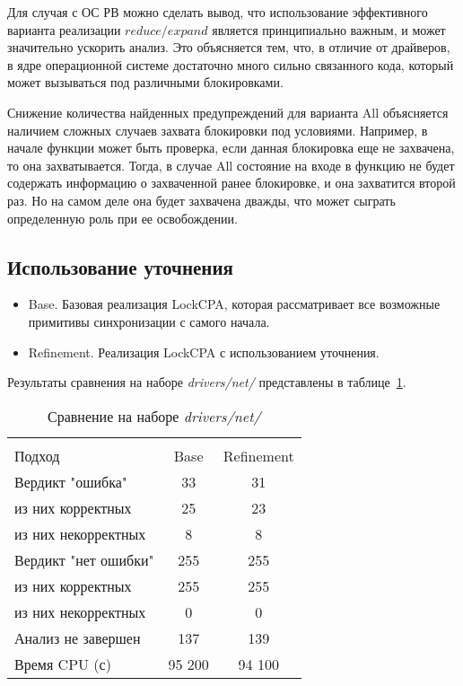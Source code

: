 Для случая с ОС РВ можно сделать вывод, что использование эффективного варианта реализации $reduce/expand$ является принципиально важным, и может значительно ускорить анализ.
Это объясняется тем, что, в отличие от драйверов, в ядре операционной системе достаточно много сильно связанного кода, который может вызываться под различными блокировками.

Снижение количества найденных предупреждений для варианта All объясняется наличием сложных случаев захвата блокировки под условиями.
Например, в начале функции может быть проверка, если данная блокировка еще не захвачена, то она захватывается. 
Тогда, в случае All состояние на входе в функцию не будет содержать информацию о захваченной ранее блокировке, и она захватится второй раз.
Но на самом деле она будет захвачена дважды, что может сыграть определенную роль при ее освобождении. 

\subsection{Использование уточнения}

\begin{itemize}
\item Base. Базовая реализация LockCPA, которая рассматривает все возможные примитивы синхронизации с самого начала.
\item Refinement. Реализация LockCPA с использованием уточнения.
\end{itemize}

Результаты сравнения на наборе \textit{drivers/net/} представлены в таблице~\ref{table-drivers-lock-refinement}.

  \begin{table}[h]\footnotesize \centering
    \caption{Сравнение на наборе \textit{drivers/net/}}
  	\label{table-drivers-lock-refinement}
    \begin{tabular}{ | l | c | c | }
      \hline 
      		& 		\multicolumn{2}{c|}{\combatmode}  \\
      Подход         				& Base   	& Refinement \\ \hline
      Вердикт "ошибка" 				& 33    	& 31       \\ 
  \hspace{0.5cm} из них корректных 	& 25 		& 23 		\\ 
  \hspace{0.5cm} из них некорректных & 8 		& 8 		\\ \hline
      Вердикт "нет ошибки"  		& 255      	& 255       	\\ 
  \hspace{0.5cm} из них корректных 	& 255 		& 255    	\\
  \hspace{0.5cm} из них некорректных & 0 		& 0    		\\ \hline
      Анализ не завершен       		& 137     	& 139        \\ \hline
      Время CPU (с)   				& 95 200 	& 94 100    \\ 
      \hline
    \end{tabular}
  \end{table}

